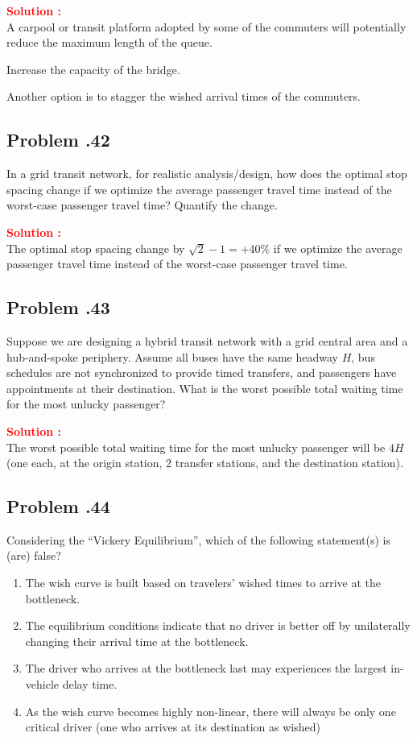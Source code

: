 \documentclass[12pt]{article}
\newcommand{\customsubsection}[1]{
  \subsection*{Problem \thesection.#1}
}
\begin{document}
\textbf{\textcolor{red}{Solution :}} \\
A carpool or transit platform adopted by some of the commuters will potentially reduce the maximum length of the queue.

Increase the capacity of the bridge.

Another option is to stagger the wished arrival times of the commuters.


\newpage

\customsubsection{42}
In a grid transit network, for realistic analysis/design, how does the optimal stop spacing change if we optimize the average passenger travel time instead of the worst-case passenger travel time? Quantify the change.


\textbf{\textcolor{red}{Solution :}} \\
The optimal stop spacing change by $\sqrt{2}-1=$+40\% if we optimize the average passenger travel time instead of the worst-case passenger travel time.\\



\newpage

\customsubsection{43}
Suppose we are designing a hybrid transit network with a grid central area and a hub-and-spoke periphery. Assume all buses have the same headway $H$, bus schedules are not synchronized to provide timed transfers, and passengers have appointments at their destination. What is the worst possible total waiting time for the most unlucky passenger?


\textbf{\textcolor{red}{Solution :}} \\
The worst possible total waiting time for the most unlucky passenger will be $4H$ (one each, at the origin station, 2 transfer stations, and the destination station).



\newpage

\customsubsection{44}
Considering the “Vickery Equilibrium”, which of the following statement(s) is (are) false?

\begin{enumerate}
    \item The wish curve is built based on travelers’ wished times to arrive at the bottleneck.
    \item The equilibrium conditions indicate that no driver is better off by unilaterally changing their arrival time at the bottleneck.
    \item The driver who arrives at the bottleneck last may experiences the largest in-vehicle delay time.
    \item As the wish curve becomes highly non-linear, there will always be only one critical driver (one who arrives at its destination as wished)
\end{enumerate}
\end{document}
